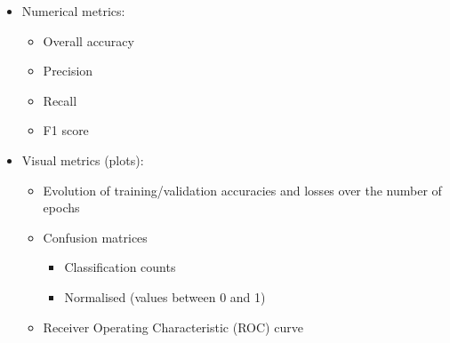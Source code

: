\begin{itemize}
    \item Numerical metrics:
    \begin{itemize}
        \item Overall accuracy
        \item Precision
        \item Recall
        \item F1 score
    \end{itemize}
    \item Visual metrics (plots):
    \begin{itemize}
        \item Evolution of training/validation accuracies and losses over the number of epochs
        \item Confusion matrices
        \begin{itemize}
            \item Classification counts
            \item Normalised (values between 0 and 1)
        \end{itemize}
        \item Receiver Operating Characteristic (ROC) curve
    \end{itemize}
\end{itemize}
